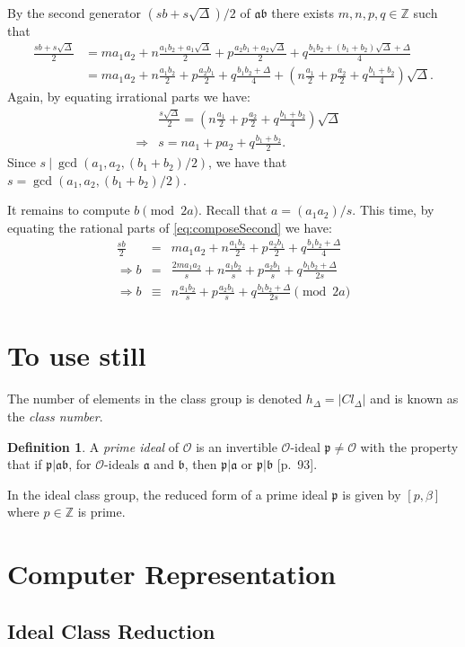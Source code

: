 \documentclass{ucalgthes1}
\theoremstyle{plain}
\theoremstyle{definition}
\newtheorem{defn}[thm]{Definition}
\newcommand{\OO}{\mathcal{O}}
\newcommand{\ZZ}{\mathbb{Z}}
\begin{document}
By the second generator $(sb+s\sqrt\Delta)/2$ of $\mathfrak{a}\mathfrak{b}$ there exists $m, n, p, q \in \ZZ$ such that
\begin{equation}
\begin{split}
	\frac{sb+s\sqrt\Delta}{2} & = ma_1a_2 + n\frac{a_1b_2+a_1\sqrt\Delta}{2} + p\frac{a_2b_1 + a_2\sqrt{\Delta}}{2} + q\frac{b_1b_2 + (b_1+b_2)\sqrt{\Delta} + \Delta}{4} \\
	& = ma_1a_2 + n\frac{a_1b_2}{2} + p\frac{a_2b_1}{2} + q\frac{b_1b_2 + \Delta}{4} + \left(n\frac{a_1}{2} + p\frac{a_2}{2} + q\frac{b_1+b_2}{4}\right)\sqrt\Delta. \label{eq:composeSecond}
\end{split}
\end{equation}
Again, by equating irrational parts we have:
\begin{eqnarray*}
	&& \frac{s\sqrt\Delta}{2} = \left(n\frac{a_1}{2} + p\frac{a_2}{2} + q\frac{b_1+b_2}{4}\right)\sqrt\Delta \\
	& \Rightarrow & s = na_1 + pa_2 + q\frac{b_1+b_2}{2}.
\end{eqnarray*}
Since $s~|~\gcd(a_1, a_2, (b_1+b_2)/2)$, we have that $s = \gcd(a_1, a_2, (b_1+b_2)/2)$.  

It remains to compute $b \pmod{2a}$.  Recall that $a = (a_1a_2)/s$.  This time, by equating the rational parts of \eqref{eq:composeSecond} we have:
\begin{eqnarray*}
	\frac{sb}{2} & = & ma_1a_2 + n\frac{a_1b_2}{2} + p\frac{a_2b_1}{2} + q\frac{b_1b_2 + \Delta}{4} \\
	\Rightarrow b & = & \frac{2ma_1a_2}{s} + n\frac{a_1b_2}{s} + p\frac{a_2b_1}{s} + q\frac{b_1b_2 + \Delta}{2s} \\
	\Rightarrow b & \equiv & n\frac{a_1b_2}{s} + p\frac{a_2b_1}{s} + q\frac{b_1b_2 + \Delta}{2s} \pmod{2a}
\end{eqnarray*}


\bigbreak
\section{To use still}

The number of elements in the class group is denoted $h_\Delta = |Cl_\Delta|$ and is known as the \emph{class number}.


\begin{defn}
A \emph{prime ideal} of $\OO$ is an invertible $\OO$-ideal $\mathfrak{p} \neq \OO$ with the property that if $\mathfrak{p} | \mathfrak{a}\mathfrak{b}$, for $\OO$-ideals $\mathfrak{a}$ and $\mathfrak{b}$, then $\mathfrak{p} | \mathfrak{a}$ or $\mathfrak{p} | \mathfrak{b}$ \cite{JacobsonCh4}[p.~93].
\end{defn}
In the ideal class group, the reduced form of a prime ideal $\mathfrak{p}$ is given by $[p, \beta]$ where $p \in \ZZ$ is prime.


\bigbreak
\section{Computer Representation}
\label{section:computerRepresentation}

\subsection{Ideal Class Reduction}
\label{subsection:idealClassReduction}
\end{document}
